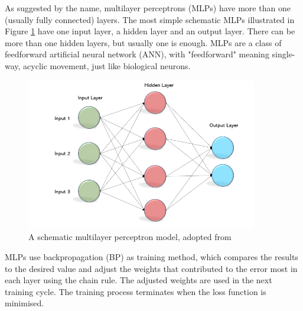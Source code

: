 \documentclass[nobib]{tufte-handout}
\begin{document}
\noindent As suggested by the name, multilayer perceptrons (MLPs) have more than one (usually fully connected) layers. The most simple schematic MLPs illustrated in Figure \ref{fig:mlp} have one input layer, a hidden layer and an output layer. There can be more than one hidden layers, but usually one is enough. MLPs are a class of feedforward artificial neural network (ANN), with "feedforward" meaning single-way, acyclic movement, just like biological neurons.\\ 
\begin{figure}
  \includegraphics[width=0.9\textwidth]{mlp3.png}
  \caption{A schematic multilayer perceptron model, adopted from \cite{becominghuman:MLP}}
  \label{fig:mlp}
\end{figure}
\noindent MLPs use backpropagation (BP) as training method, which compares the results to the desired value and adjust the weights that contributed to the error most in each layer using the chain rule. The adjusted weights are used in the next training cycle. The training process terminates when the loss function is minimised.


\end{document}
